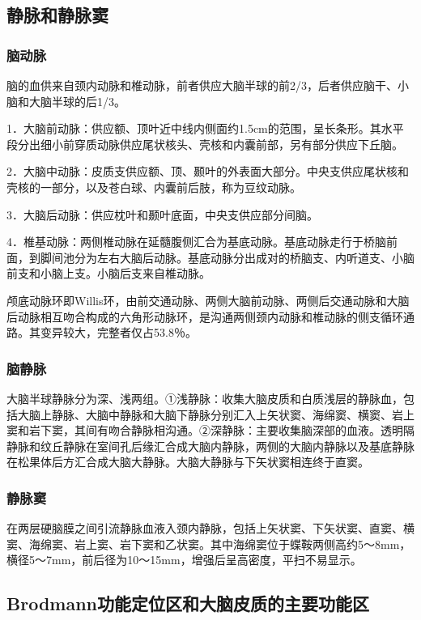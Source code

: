 \subsection{静脉和静脉窦}

\subsubsection{脑动脉}

脑的血供来自颈内动脉和椎动脉，前者供应大脑半球的前2/3，后者供应脑干、小脑和大脑半球的后1/3。

1．大脑前动脉：供应额、顶叶近中线内侧面约1.5cm的范围，呈长条形。其水平段分出细小前穿质动脉供应尾状核头、壳核和内囊前部，另有部分供应下丘脑。

2．大脑中动脉：皮质支供应额、顶、颞叶的外表面大部分。中央支供应尾状核和壳核的一部分，以及苍白球、内囊前后肢，称为豆纹动脉。

3．大脑后动脉：供应枕叶和颞叶底面，中央支供应部分间脑。

4．椎基动脉：两侧椎动脉在延髓腹侧汇合为基底动脉。基底动脉走行于桥脑前面，到脚间池分为左右大脑后动脉。基底动脉分出成对的桥脑支、内听道支、小脑前支和小脑上支。小脑后支来自椎动脉。

颅底动脉环即Willis环，由前交通动脉、两侧大脑前动脉、两侧后交通动脉和大脑后动脉相互吻合构成的六角形动脉环，是沟通两侧颈内动脉和椎动脉的侧支循环通路。其变异较大，完整者仅占53.8％。

\subsubsection{脑静脉}

大脑半球静脉分为深、浅两组。①浅静脉：收集大脑皮质和白质浅层的静脉血，包括大脑上静脉、大脑中静脉和大脑下静脉分别汇入上矢状窦、海绵窦、横窦、岩上窦和岩下窦，其间有吻合静脉相沟通。②深静脉：主要收集脑深部的血液。透明隔静脉和纹丘静脉在室间孔后缘汇合成大脑内静脉，两侧的大脑内静脉以及基底静脉在松果体后方汇合成大脑大静脉。大脑大静脉与下矢状窦相连终于直窦。

\subsubsection{静脉窦}

在两层硬脑膜之间引流静脉血液入颈内静脉，包括上矢状窦、下矢状窦、直窦、横窦、海绵窦、岩上窦、岩下窦和乙状窦。其中海绵窦位于蝶鞍两侧高约5～8mm，横径5～7mm，前后径为10～15mm，增强后呈高密度，平扫不易显示。

\subsection{Brodmann功能定位区和大脑皮质的主要功能区}

